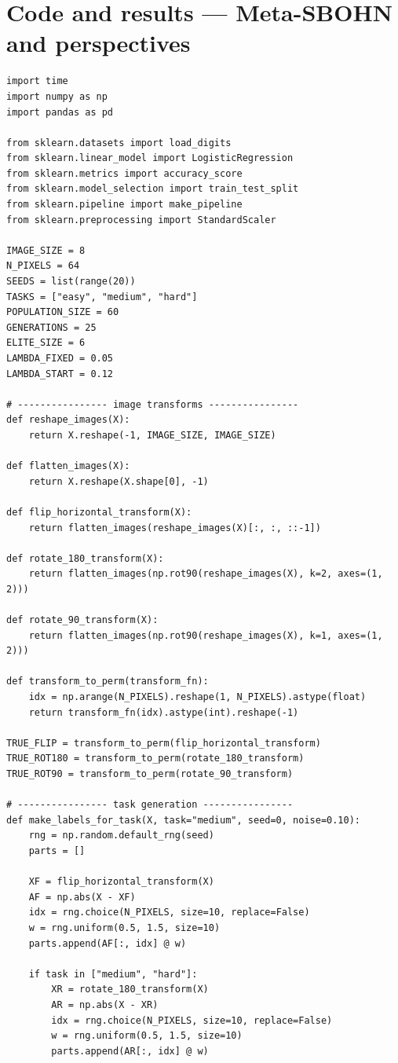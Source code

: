 \documentclass[11pt,a4paper]{report}
\begin{document}
\section{Code and results --- Meta-SBOHN and perspectives}

\label{app:ch8-lst1}
\begin{lstlisting}[style=python,caption={Unified Python code for Meta-SBOHN v5/v6 tests.}]
import time
import numpy as np
import pandas as pd

from sklearn.datasets import load_digits
from sklearn.linear_model import LogisticRegression
from sklearn.metrics import accuracy_score
from sklearn.model_selection import train_test_split
from sklearn.pipeline import make_pipeline
from sklearn.preprocessing import StandardScaler

IMAGE_SIZE = 8
N_PIXELS = 64
SEEDS = list(range(20))
TASKS = ["easy", "medium", "hard"]
POPULATION_SIZE = 60
GENERATIONS = 25
ELITE_SIZE = 6
LAMBDA_FIXED = 0.05
LAMBDA_START = 0.12

# ---------------- image transforms ----------------
def reshape_images(X):
    return X.reshape(-1, IMAGE_SIZE, IMAGE_SIZE)

def flatten_images(X):
    return X.reshape(X.shape[0], -1)

def flip_horizontal_transform(X):
    return flatten_images(reshape_images(X)[:, :, ::-1])

def rotate_180_transform(X):
    return flatten_images(np.rot90(reshape_images(X), k=2, axes=(1, 2)))

def rotate_90_transform(X):
    return flatten_images(np.rot90(reshape_images(X), k=1, axes=(1, 2)))

def transform_to_perm(transform_fn):
    idx = np.arange(N_PIXELS).reshape(1, N_PIXELS).astype(float)
    return transform_fn(idx).astype(int).reshape(-1)

TRUE_FLIP = transform_to_perm(flip_horizontal_transform)
TRUE_ROT180 = transform_to_perm(rotate_180_transform)
TRUE_ROT90 = transform_to_perm(rotate_90_transform)

# ---------------- task generation ----------------
def make_labels_for_task(X, task="medium", seed=0, noise=0.10):
    rng = np.random.default_rng(seed)
    parts = []

    XF = flip_horizontal_transform(X)
    AF = np.abs(X - XF)
    idx = rng.choice(N_PIXELS, size=10, replace=False)
    w = rng.uniform(0.5, 1.5, size=10)
    parts.append(AF[:, idx] @ w)

    if task in ["medium", "hard"]:
        XR = rotate_180_transform(X)
        AR = np.abs(X - XR)
        idx = rng.choice(N_PIXELS, size=10, replace=False)
        w = rng.uniform(0.5, 1.5, size=10)
        parts.append(AR[:, idx] @ w)


\end{lstlisting}
\end{document}
